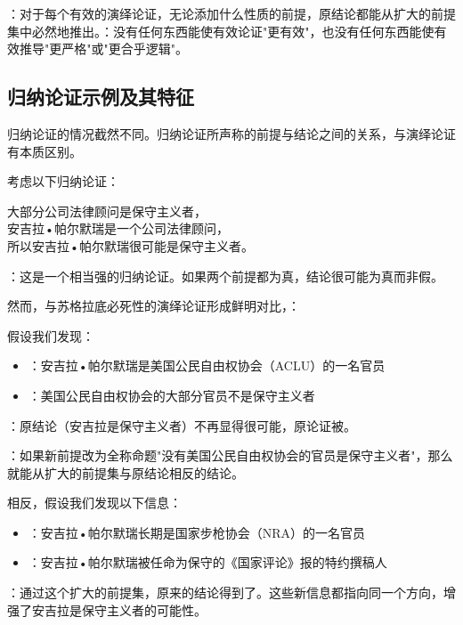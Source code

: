 ：对于每个有效的演绎论证，无论添加什么性质的前提，原结论都能从扩大的前提集中必然地推出。：没有任何东西能使有效论证"更有效"，也没有任何东西能使有效推导"更严格"或"更合乎逻辑"。

\subsection{归纳论证示例及其特征}

归纳论证的情况截然不同。归纳论证所声称的前提与结论之间的关系，与演绎论证有本质区别。

\begin{examplebox}[title=归纳论证的可变性示例]
考虑以下归纳论证：
\begin{displayquote}
大部分公司法律顾问是保守主义者，\\
安吉拉•帕尔默瑞是一个公司法律顾问，\\
所以安吉拉•帕尔默瑞很可能是保守主义者。
\end{displayquote}

：这是一个相当强的归纳论证。如果两个前提都为真，结论很可能为真而非假。
\end{examplebox}

然而，与苏格拉底必死性的演绎论证形成鲜明对比，：

\begin{examplebox}[title=弱化论证的新信息]
假设我们发现：
\begin{itemize}
  \item {}：安吉拉•帕尔默瑞是美国公民自由权协会（ACLU）的一名官员
  \item {}：美国公民自由权协会的大部分官员不是保守主义者
\end{itemize}

：原结论（安吉拉是保守主义者）不再显得很可能，原论证被。

：如果新前提改为全称命题"没有美国公民自由权协会的官员是保守主义者"，那么就能从扩大的前提集与原结论相反的结论。
\end{examplebox}

\begin{examplebox}[title=强化论证的新信息]
相反，假设我们发现以下信息：
\begin{itemize}
  \item {}：安吉拉•帕尔默瑞长期是国家步枪协会（NRA）的一名官员
  \item {}：安吉拉•帕尔默瑞被任命为保守的《国家评论》报的特约撰稿人
\end{itemize}

：通过这个扩大的前提集，原来的结论得到了。这些新信息都指向同一个方向，增强了安吉拉是保守主义者的可能性。
\end{examplebox}

